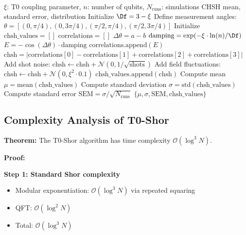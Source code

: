 \begin{algorithm}[H]
	\caption{Monte Carlo Bell Test Simulation}
	\begin{algorithmic}[1]
		\REQUIRE $\xi$: T0 coupling parameter, $n$: number of qubits, $N_{\text{runs}}$: simulations
		\ENSURE CHSH mean, standard error, distribution
		\STATE Initialize $\Df = 3 - \xi$
		\STATE Define measurement angles: $\theta = [(0, \pi/4), (0, 3\pi/4), (\pi/2, \pi/4), (\pi/2, 3\pi/4)]$
		\STATE Initialize $\text{chsh\_values} = []$
		\STATE $\text{correlations} = []$
		\STATE $\Delta\theta = a - b$
		\STATE $\text{damping} = \exp(-\xi \cdot \ln(n) / \Df)$
		\STATE $E = -\cos(\Delta\theta) \cdot \text{damping}$ 
		\STATE $\text{correlations.append}(E)$
		\ENDFOR
		\STATE $\text{chsh} = |\text{correlations}[0] - \text{correlations}[1] + \text{correlations}[2] + \text{correlations}[3]|$
		\STATE Add shot noise: $\text{chsh} \leftarrow \text{chsh} + \mathcal{N}(0, 1/\sqrt{\text{shots}})$
		\STATE Add field fluctuations: $\text{chsh} \leftarrow \text{chsh} + \mathcal{N}(0, \xi^2 \cdot 0.1)$
		\STATE $\text{chsh\_values.append}(\text{chsh})$
		\ENDFOR
		\STATE Compute mean $\mu = \text{mean}(\text{chsh\_values})$
		\STATE Compute standard deviation $\sigma = \text{std}(\text{chsh\_values})$
		\STATE Compute standard error $\text{SEM} = \sigma / \sqrt{N_{\text{runs}}}$
		\RETURN $\{\mu, \sigma, \text{SEM}, \text{chsh\_values}\}$
	\end{algorithmic}
\end{algorithm}

\subsection{Complexity Analysis of T0-Shor}
\label{app:complexity}

\textbf{Theorem:} The T0-Shor algorithm has time complexity $\mathcal{O}(\log^3 N)$.

\textbf{Proof:}

\textbf{Step 1: Standard Shor complexity}
\begin{itemize}
	\item Modular exponentiation: $\mathcal{O}(\log^3 N)$ via repeated squaring
	\item QFT: $\mathcal{O}(\log^2 N)$
	\item Total: $\mathcal{O}(\log^3 N)$
\end{itemize}

